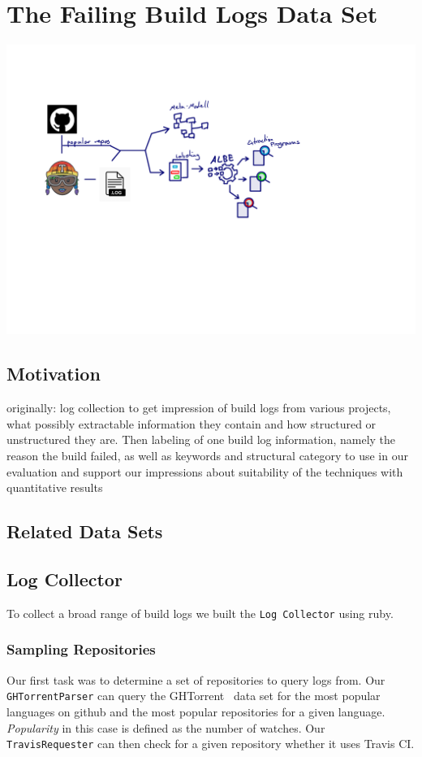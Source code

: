 \documentclass[\myrootdir/main.tex]{subfiles}
\begin{document}
\chapter{The Failing Build Logs Data Set}
\includegraphics[page=5, width=\textwidth, trim={0.5cm 0.5cm 0.5cm 0.5cm}, clip]{img/flow-of-research.pdf}

\label{sec:data-set}
\section{Motivation}
originally: log collection to get impression of build logs from various projects, what possibly extractable information they contain and how structured or unstructured they are.
Then labeling of one build log information, namely the reason the build failed, as well as keywords and structural category to use in our evaluation and support our impressions about suitability of the techniques with quantitative results

\section{Related Data Sets}

\section{Log Collector}
To collect a broad range of build logs we built the \texttt{Log Collector} using ruby.

\subsection{Sampling Repositories}
Our first task was to determine a set of repositories to query logs from.
Our \texttt{GHTorrentParser} can query the GHTorrent~\cite{gousios2013ghtorrent} data set for the most popular languages on github and the most popular repositories for a given language.
\emph{Popularity} in this case is defined as the number of watches.
Our \texttt{TravisRequester} can then check for a given repository whether it uses Travis CI.
\end{document}
